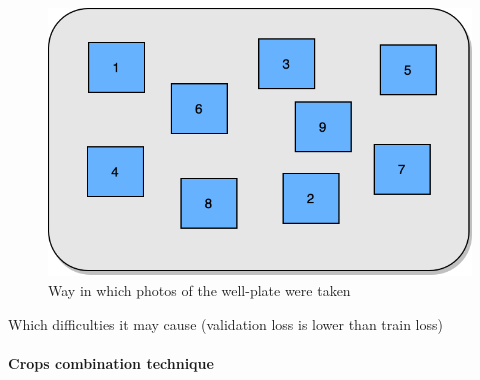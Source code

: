         
\begin{figure}[htb]
    \begin{center}
        \includegraphics[width=0.5\linewidth]{bilder/dic-random.png}
        \caption{Way in which photos of the well-plate were taken}\label{fig:random-dic}
    \end{center}
\end{figure}    
Which difficulties it may cause (validation loss is lower than train loss)
\paragraph{Crops combination technique}
    